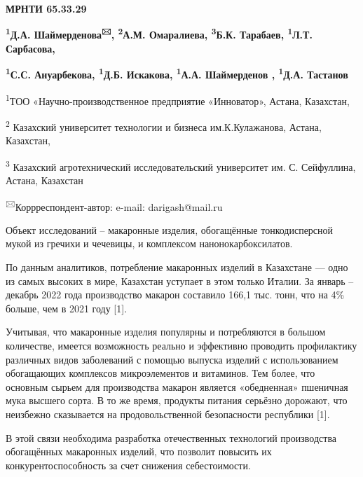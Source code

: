 
\newpage
{\bfseries МРНТИ 65.33.29}

\begin{center}

{\bfseries \textsuperscript{1}Д.А. Шаймерденова\textsuperscript{🖂},
\textsuperscript{2}А.М. Омаралиева, \textsuperscript{3}Б.К. Тарабаев,
\textsuperscript{1}Л.Т. Сарбасова,}

{\bfseries \textsuperscript{1}С.С. Ануарбекова, \textsuperscript{1}Д.Б.
Искакова, \textsuperscript{1}А.А. Шаймерденов , \textsuperscript{1}Д.А.
Тастанов}

\textsuperscript{1}ТОО «Научно-производственное предприятие «Инноватор»,
Астана, Казахстан,

\textsuperscript{2} Казахский университет технологии и бизнеса
им.К.Кулажанова, Астана, Казахстан,

\textsuperscript{3} Казахский агротехнический исследовательский
университет им. С. Сейфуллина, Астана, Казахстан
\end{center}

\textsuperscript{🖂}Коррреспондент-автор: e-mail: darigash@mail.ru

Объект исследований -- макаронные изделия, обогащённые тонкодисперсной
мукой из гречихи и чечевицы, и комплексом нанонокарбоксилатов.

По данным аналитиков, потребление макаронных изделий в Казахстане ---
одно из самых высоких в мире, Казахстан уступает в этом только Италии.
За январь -- декабрь 2022 года производство макарон составило 166,1 тыс.
тонн, что на 4\% больше, чем в 2021 году {[}1{]}.

Учитывая, что макаронные изделия популярны и потребляются в большом
количестве, имеется возможность реально и эффективно проводить
профилактику различных видов заболеваний с помощью выпуска изделий с
использованием обогащающих комплексов микроэлементов и витаминов. Тем
более, что основным сырьем для производства макарон является
«обедненная» пшеничная мука высшего сорта. В то же время, продукты
питания серьёзно дорожают, что неизбежно сказывается на
продовольственной безопасности республики {[}1{]}.

В этой связи необходима разработка отечественных технологий производства
обогащённых макаронных изделий, что позволит повысить их
конкурентоспособность за счет снижения себестоимости.

